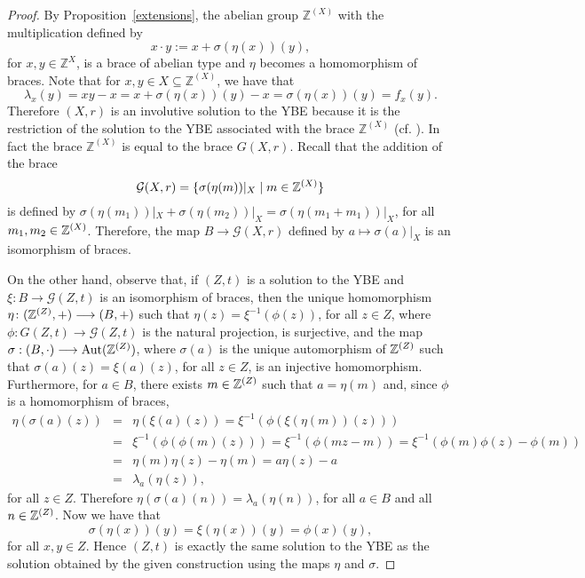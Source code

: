 \begin{proof}
	By Proposition~\ref{extensions}, the abelian group
	$\mathbb{Z}^{(X)}$ with the multiplication defined  by
	$$x\cdot y:=x+\sigma(\eta(x))(y),$$
	for $x,y\in \mathbb{Z}^{X}$, is a brace of abelian type and $\eta$ becomes a
	homomorphism of braces. Note that for $x, y\in X\subseteq
	\mathbb{Z}^{(X)}$, we have that
	$$\lambda_x(y)=xy-x=x+\sigma(\eta(x))(y)-x=\sigma(\eta(x))(y)=f_x(y).$$
	Therefore $(X,r)$ is an involutive solution to the YBE because it is the
	restriction of the solution to the YBE associated with the 
	brace $\mathbb{Z}^{(X)}$ (cf. \cite[Lemma~2]{CJO2}). In fact the
	brace $\mathbb{Z}^{(X)}$ is equal to the brace $G(X,r)$.
	Recall that the addition of the brace
	$$\mathcal{G}(X,r)=\{ \sigma(\eta(m))|_{X}\mid m\in \mathbb{Z}^{(X)}\}$$
	is defined by
	$\sigma(\eta(m_1))|_{X}+\sigma(\eta(m_2))|_{X}=\sigma(\eta(m_1+m_1))|_{X}$,
	for all $m_1,m_2\in \mathbb{Z}^{(X)}$.  Therefore, the map $B\longrightarrow
	\mathcal{G}(X,r)$ defined by $a\mapsto \sigma(a)|_{X}$ is an
	isomorphism of  braces.
	
	On the other hand, observe that, if $(Z,t)$ is a solution to the YBE
	and  $\xi\colon B\longrightarrow \mathcal{G}(Z,t)$ is an isomorphism
	of braces, then the unique homomorphism  $\eta\colon
	(\mathbb{Z}^{(Z)},+)\longrightarrow  (B,+)$ such that
	$\eta(z)=\xi^{-1}(\phi(z))$, for all $z\in Z$, where $\phi\colon
	G(Z,t)\longrightarrow \mathcal{G}(Z,t)$ is the natural projection,
	is surjective, and the map
	$\sigma:(B,\cdot)\longrightarrow\operatorname{Aut}(\mathbb{Z}^{(Z)})$, where $\sigma(a)$
	is the unique automorphism of $\mathbb{Z}^{(Z)}$ such that
	$\sigma(a)(z)=\xi(a)(z)$, for all $z\in Z$, is an injective
	homomorphism. Furthermore, for $a\in B$, there exists $m\in
	\mathbb{Z}^{(Z)}$ such that $a=\eta(m)$ and,   since $\phi$
	is a homomorphism of braces,
	\begin{eqnarray*}
		\eta(\sigma(a)(z))&=&\eta(\xi(a)(z))=\xi^{-1}(\phi(\xi(\eta(m))(z)))\\
		&=&\xi^{-1}(\phi(\phi(m)(z)))=\xi^{-1}(\phi(mz-m))=\xi^{-1}(\phi(m)\phi(z)-\phi(m))\\
		&=&\eta(m)\eta(z)-\eta(m)=a\eta(z)-a\\
		&=&\lambda_a(\eta(z)),
	\end{eqnarray*}
	for all $z\in Z$. Therefore $\eta(\sigma(a)(n))=\lambda_a(\eta(n))$,
	for all $a\in B$ and all $n\in \mathbb{Z}^{(Z)}$. Now we have that
	$$\sigma(\eta(x))(y)=\xi(\eta(x))(y)=\phi(x)(y),$$
	for all $x,y\in Z$. Hence $(Z,t)$ is exactly the same solution to
	the YBE  as the solution obtained by the given construction using
	the maps $\eta$ and $\sigma$.
\end{proof}

